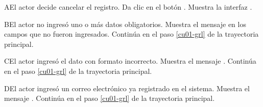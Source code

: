 \begin{UCtrayectoriaA}{A}{El actor decide cancelar el registro.}
	\UCpaso [\UCactor] Da clic en el botón .
	\UCpaso [\UCsist] Muestra la interfaz .
\end{UCtrayectoriaA} 

\begin{UCtrayectoriaA}{B}{El actor no ingresó uno o más datos obligatorios.}
	\UCpaso [\UCsist] Muestra el mensaje  en los campos que no
	fueron ingresados.
	\UCpaso [\UCsist] Continúa en el paso \ref{cu01-grl} de la trayectoria principal.
\end{UCtrayectoriaA} 

\begin{UCtrayectoriaA}{C}{El actor ingresó el dato con formato incorrecto.}
	\UCpaso [\UCsist] Muestra el mensaje .
	\UCpaso [\UCsist] Continúa en el paso \ref{cu01-grl} de la trayectoria principal.
\end{UCtrayectoriaA} 

\begin{UCtrayectoriaA}{D}{El actor ingresó un correo electrónico ya registrado en el sistema.}
	\UCpaso [\UCsist] Muestra el mensaje .
	\UCpaso [\UCsist] Continúa en el paso \ref{cu01-grl} de la trayectoria principal.
\end{UCtrayectoriaA} 



